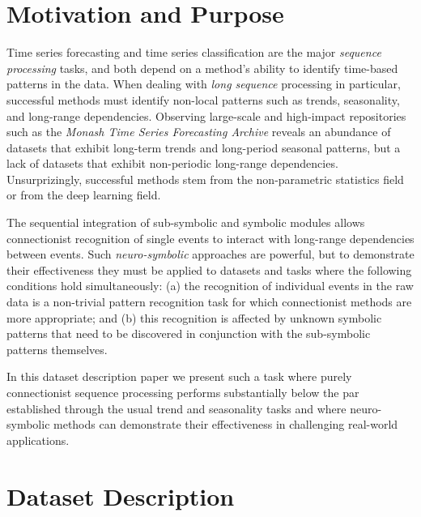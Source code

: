 \documentclass[twocolumn]{ceurart}
\begin{document}
\section{Motivation and Purpose}

Time series forecasting and time series classification are the major
\emph{sequence processing} tasks, and both depend on a method's
ability to identify time-based patterns in the data. When dealing
with \emph{long sequence} processing in particular, successful methods
must identify non-local patterns such as trends, seasonality, and
long-range dependencies. Observing large-scale and high-impact
repositories such as the 
\emph{Monash Time Series Forecasting Archive} \citep{godahewa-etal-2021}
reveals an abundance of datasets that exhibit long-term trends and
long-period seasonal patterns, but a lack of datasets that exhibit
non-periodic long-range dependencies. Unsurprizingly, successful
methods stem from the non-parametric statistics field or from the deep
learning field.

The sequential integration of sub-symbolic and symbolic modules allows
connectionist recognition of single events to interact with long-range
dependencies between events. Such \emph{neuro-symbolic} approaches are
powerful, but to demonstrate their effectiveness they must be applied
to datasets and tasks where the following conditions hold simultaneously:
(a) the recognition of individual events in the raw data is a
non-trivial pattern recognition task for which connectionist methods
are more appropriate; and (b) this recognition is affected by unknown
symbolic patterns that need to be discovered in conjunction with the
sub-symbolic patterns themselves.

In this dataset description paper we present such a task where purely
connectionist sequence processing performs substantially below the par
established through the usual trend and seasonality tasks and where
neuro-symbolic methods can demonstrate their effectiveness in
challenging real-world applications.

\section{Dataset Description}
\end{document}
